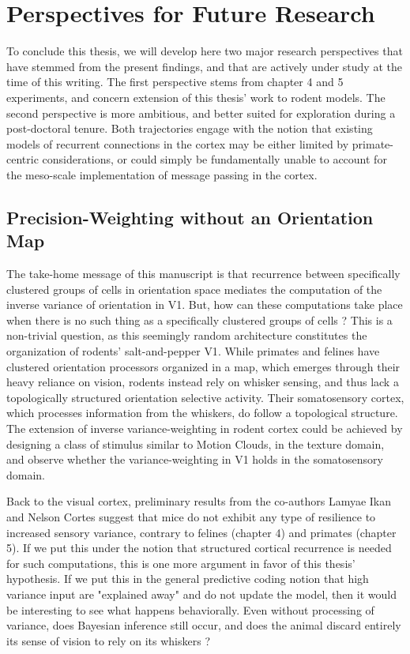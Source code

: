 \section{Perspectives for Future Research}
To conclude this thesis, we will develop here two major research perspectives that have stemmed from the present findings, and that are actively under study at the time of this writing. The first perspective stems from chapter 4 and 5 experiments, and concern extension of this thesis' work to rodent models. The second perspective is more ambitious, and better suited for exploration during a post-doctoral tenure. Both trajectories engage with the notion that existing models of recurrent connections in the cortex may be either limited by primate-centric considerations, or could simply be fundamentally unable to account for the meso-scale implementation of message passing in the cortex.

\subsection{Precision-Weighting without an Orientation Map}
The take-home message of this manuscript is that recurrence between specifically clustered groups of cells in orientation space mediates the computation of the inverse variance of orientation in \gls{V1}. But, how can these computations take place when there is no such thing as a specifically clustered groups of cells ? This is a non-trivial question, as this seemingly random architecture constitutes the organization of rodents' salt-and-pepper \gls{V1}. While primates and felines have clustered orientation processors organized in a map, which emerges through their heavy reliance on vision, rodents instead rely on whisker sensing, and thus lack a topologically structured orientation selective activity. Their somatosensory cortex, which processes information from the whiskers, do follow a topological structure. The extension of inverse variance-weighting in rodent cortex could be achieved by designing a class of stimulus similar to Motion Clouds, in the texture domain, and observe whether the variance-weighting in \gls{V1} holds in the somatosensory domain.

Back to the visual cortex, preliminary results from the co-authors Lamyae Ikan and Nelson Cortes suggest that mice do not exhibit any type of resilience to increased sensory variance, contrary to felines (chapter 4) and primates (chapter 5). If we put this under the notion that structured cortical recurrence is needed for such computations, this is one more argument in favor of this thesis' hypothesis. If we put this in the general predictive coding notion that high variance input are "explained away" and do not update the model, then it would be interesting to see what happens behaviorally. Even without processing of variance, does Bayesian inference still occur, and does the animal discard entirely its sense of vision to rely on its whiskers ? 

